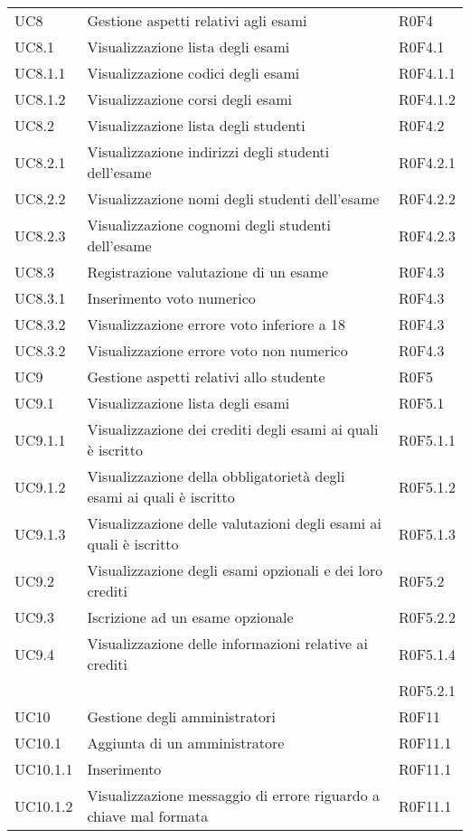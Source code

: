 \documentclass[AnalisiDeiRequisiti.tex]{subfiles}
\begin{document}
\begin{longtable}[H]{p{2cm}p{5cm}p{5cm}}
	
	UC8 & Gestione aspetti relativi agli esami & R0F4 \\
	UC8.1 & Visualizzazione lista degli esami & R0F4.1 \\
	UC8.1.1 & Visualizzazione codici degli esami & R0F4.1.1 \\
	UC8.1.2 & Visualizzazione corsi degli esami & R0F4.1.2 \\
	UC8.2 & Visualizzazione lista degli studenti & R0F4.2  \\
	UC8.2.1 & Visualizzazione indirizzi degli studenti dell'esame & R0F4.2.1 \\
	UC8.2.2 & Visualizzazione nomi degli studenti dell'esame & R0F4.2.2 \\
	UC8.2.3 & Visualizzazione cognomi degli studenti dell'esame & R0F4.2.3 \\
	UC8.3 & Registrazione valutazione di un esame & R0F4.3 \\
	UC8.3.1 & Inserimento voto numerico & R0F4.3 \\
	UC8.3.2 & Visualizzazione errore voto inferiore a 18 & R0F4.3 \\
	UC8.3.2 & Visualizzazione errore voto non numerico & R0F4.3 \\
	UC9 & Gestione aspetti relativi allo studente & R0F5 \\
	UC9.1 & Visualizzazione lista degli esami & R0F5.1 \\
	UC9.1.1 & Visualizzazione dei crediti degli esami ai quali è iscritto & R0F5.1.1 \\
	UC9.1.2 & Visualizzazione della obbligatorietà degli esami ai quali è iscritto & R0F5.1.2 \\
	UC9.1.3 & Visualizzazione delle valutazioni degli esami ai quali è iscritto	& R0F5.1.3 \\
	UC9.2 & Visualizzazione degli esami opzionali e dei loro crediti & R0F5.2 \\
	UC9.3 & Iscrizione ad un esame opzionale & R0F5.2.2 \\
	UC9.4 & Visualizzazione delle informazioni relative ai crediti & R0F5.1.4 \\ 
	& & R0F5.2.1 \\
	UC10 & Gestione degli amministratori & R0F11 \\
	UC10.1 & Aggiunta di un amministratore & R0F11.1 \\
	UC10.1.1 & Inserimento \citGloss{chiave pubblica} & R0F11.1 \\
	UC10.1.2 & Visualizzazione messaggio di errore riguardo a chiave mal formata & R0F11.1 \\

\end{longtable}
\end{document}
